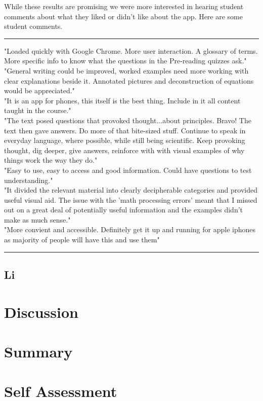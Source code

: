 \documentclass[12pt,a4paper]{article}  %
\begin{document}
While these results are promising we were more interested in hearing student comments about what they liked or didn't like about the app. Here are some student comments.

\rule[0.5ex]{1\columnwidth}{1pt}
"Loaded quickly with Google Chrome. More user interaction. A glossary of terms. More specific info to know what the questions in the Pre-reading quizzes ask."
\\[3mm]
"General writing could be improved, worked examples need more working with clear explanations beside it. Annotated pictures and deconstruction of equations would be appreciated."
\\[3mm]
"It is an app for phones, this itself is the best thing. Include in it all content taught in the course."
\\[3mm]
"The text posed questions that provoked thought...about principles. Bravo! The text then gave answers. Do more of that bite-sized stuff. Continue to speak in everyday language, where possible, while still being scientific. Keep provoking thought, dig deeper, give answers, reinforce with with visual examples of why things work the way they do."
\\[3mm]
"Easy to use, easy to access and good information. Could have questions to test understanding."
\\[3mm]
"It divided the relevant material into clearly decipherable categories and provided useful visual aid. The issue with the 'math processing errors' meant that I missed out on a great deal of potentially useful information and the examples didn't make as much sense."
\\[3mm]
"More convient and accessible. Definitely get it up and running for apple iphones as majority of people will have this and use them" \\
\rule[0.5ex]{1\columnwidth}{1pt}

\subsection{Li}


\section{Discussion}

\section{Summary}

\section{Self Assessment}



\end{document}
